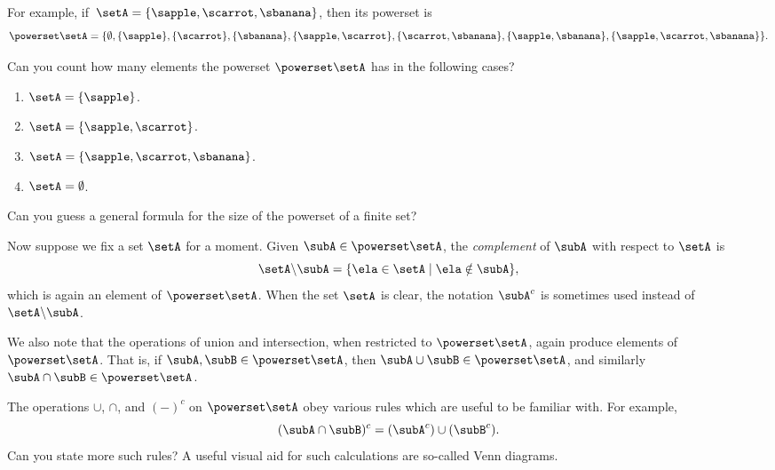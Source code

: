 For example, if~$\setA = \{ \sapple, \scarrot, \sbanana \}$, then its powerset is
\begin{equation*}
    \powerset \setA = \{ \emptyset, \{ \sapple \}, \{ \scarrot \}, \{ \sbanana\}, \{ \sapple, \scarrot \}, \{ \scarrot, \sbanana \}, \{ \sapple, \sbanana\}, \{ \sapple, \scarrot, \sbanana \} \}.
\end{equation*}

\begin{exercise}
Can you count how many elements the powerset $\powerset \setA$ has in the following cases? 
\begin{enumerate}
\item $\setA = \{ \sapple \} $. 
\item $\setA = \{ \sapple, \scarrot \} $.
\item $\setA = \{ \sapple, \scarrot, \sbanana \} $. 
\item $\setA = \emptyset $. 
\end{enumerate}
Can you guess a general formula for the size of the powerset of a finite set? 
\end{exercise}


Now suppose we fix a set $\setA$ for a moment. Given $\subA \in \powerset \setA$, the \emph{complement} of $\subA$ with respect to $\setA$ is
\begin{equation}
\setA \backslash \subA = \{ \ela \in \setA \mid \ela \notin \subA \},
\end{equation}
which is again an element of $\powerset \setA$. 
When the set $\setA$ is clear, the notation $\subA^c$ is sometimes used instead of $\setA \backslash \subA$. 

We also note that the operations of union and intersection, when restricted to $\powerset \setA$, again produce elements of $\powerset \setA$. That is, if $\subA, \subB \in \powerset \setA$, then $\subA \cup \subB \in \powerset \setA$, and similarly $\subA \cap \subB \in \powerset \setA$. 

The operations $\cup$, $\cap$, and $( - )^c$ on $\powerset \setA$ obey various rules which are useful to be familiar with. For example, 
\begin{equation}
(\subA \cap \subB)^c = (\subA^c) \cup (\subB^c).
\end{equation}
Can you state more such rules? 
A useful visual aid for such calculations are so-called Venn diagrams. 





